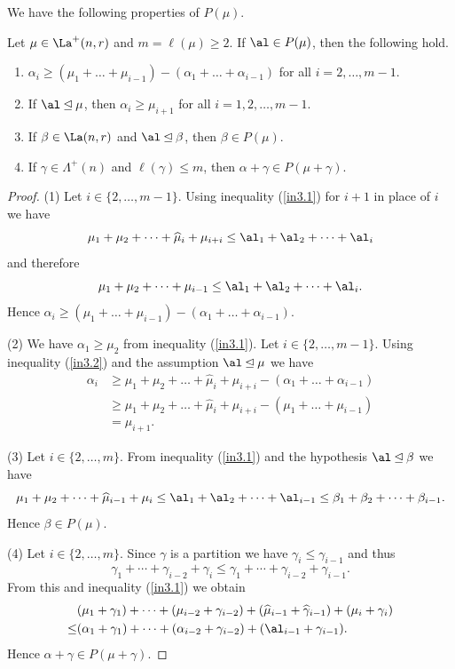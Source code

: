 We have the following properties of $P(\mu)$.	
	\begin{lemma}\label{rem11}Let $\mu\in \La^+(n,r)$ and $m=\ell(\mu) \ge 2$. If $\al \in P(\mu)$, then the following hold. \begin{enumerate} \item $\alpha_{i} \ge (\mu_1+\dots+\mu_{i-1})-(\alpha_1 +\dots+\alpha_{i-1})$ for all $i=2,\dots,m-1$. \item If $\al \unlhd \mu$, then $\alpha_i \ge \mu_{i+1}$ for all $i=1,2,\dots,m-1$.  \item If $\beta \in \La(n,r)$ and $\al \unlhd \beta$, then $\beta \in P(\mu)$. \item If $\gamma \in \Lambda^+(n)$ and $\ell(\gamma) \le m$, then $\alpha+\gamma \in P(\mu +\gamma)$.\end{enumerate} \end{lemma}
	\begin{proof}
		(1) Let $ i \in \{2, \dots, m-1\}$. Using inequality (\ref{in3.1}) for $i+1$ in place of $i$ we have \begin{equation}\label{in3.2}\mu_1 +\mu_2 + \dots +\widehat{\mu}_{i}+\mu_{i+i} \le \al_1+\al_2+\dots+\al_{i}\end{equation} and therefore
		\[\mu_1 +\mu_2 + \dots +\mu_{i-1} \le \al_1+\al_2+\dots+\al_{i}.\] Hence  
	$\alpha_{i} \ge (\mu_1+\dots+\mu_{i-1})-(\alpha_1 +\dots+\alpha_{i-1})$.
	
	(2)	We have $\alpha_1 \ge \mu_2$ from inequality (\ref{in3.1}). Let $ i \in \{2, \dots, m-1\}$. Using inequality (\ref{in3.2}) and the assumption $\al \unlhd \mu$ we have \begin{align*}
		\alpha_i &\ge \mu_1 +\mu_2 + \dots +\widehat{\mu}_{i}+\mu_{i+i} -(\alpha_1 +\dots+\alpha_{i-1})\\ &\ge \mu_1 +\mu_2 + \dots +\widehat{\mu}_{i}+\mu_{i+i} -(\mu_1 +\dots+\mu_{i-1})\\&=\mu_{i+1}.
	\end{align*}
	
	(3) Let $ i \in \{2, \dots, m\}$. From inequality (\ref{in3.1}) and the hypothesis $\al \unlhd \beta$ we have \[ \mu_1 +\mu_2 + \dots +\widehat{\mu}_{i-1}+\mu_{i} \le \al_1+\al_2+\dots+\al_{i-1} \le \beta_1+\beta_2+\dots+\beta_{i-1}.\] Hence $\beta \in P(\mu)$.
	
	(4) Let $ i \in \{2, \dots, m\}$. Since $\gamma$ is a partition we have $\gamma_i \le \gamma_{i-1}$ and thus \[\gamma_1+\cdots +\gamma_{i-2} + \gamma_i \le \gamma_1+ \cdots +\gamma_{i-2} +\gamma_{i-1}. \] From this and inequality (\ref{in3.1}) we obtain
	 \begin{align*}
		&(\mu_1+\gamma_1)+\cdots +(\mu_{i-2}+\gamma_{i-2})+ (\widehat{\mu}_{i-1}+\widehat{\gamma}_{i-1})+(\mu_{i} + \gamma_i) \\ \le& (\alpha_1 + \gamma_1) +\dots+ (\alpha_{i-2}+\gamma_{i-2}) + (\al_{i-1}+\gamma_{i-1}).
	\end{align*}
	Hence $\alpha + \gamma \in P(\mu +\gamma)$.\end{proof}
